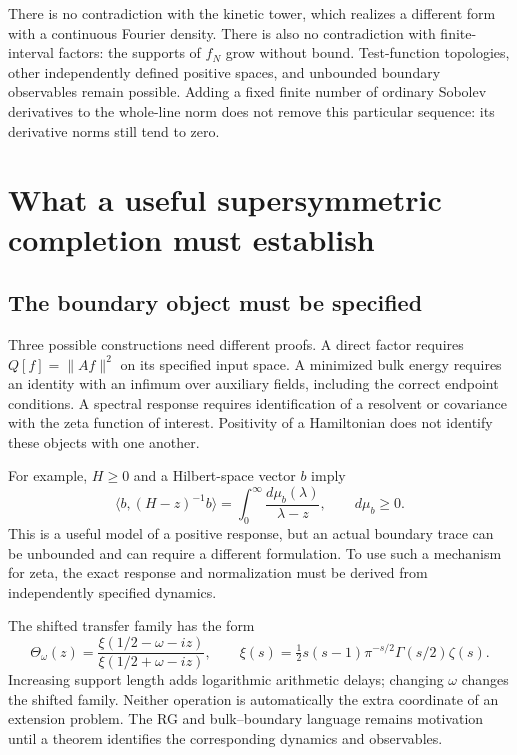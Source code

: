 \documentclass[11pt]{article}
\numberwithin{equation}{section}
\theoremstyle{definition}
\theoremstyle{remark}
\newcommand{\norm}[1]{\lVert#1\rVert}
\newcommand{\ip}[2]{\langle#1,#2\rangle}
\begin{document}
There is no contradiction with the kinetic tower, which realizes a
different form with a continuous Fourier density. There is also no
contradiction with finite-interval factors: the supports of $f_N$ grow
without bound. Test-function topologies, other independently defined
positive spaces, and unbounded boundary observables remain possible.
Adding a fixed finite number of ordinary Sobolev derivatives to the
whole-line norm does not remove this particular sequence: its derivative
norms still tend to zero.

\section{What a useful supersymmetric completion must establish}
\label{sec:program}

\subsection{The boundary object must be specified}

Three possible constructions need different proofs. A direct factor
requires $Q[f]=\norm{Af}^2$ on its specified input space. A minimized
bulk energy requires an identity with an infimum over auxiliary fields,
including the correct endpoint conditions. A spectral response requires
identification of a resolvent or covariance with the zeta function of
interest. Positivity of a Hamiltonian does not identify these objects
with one another.

For example, $H\geq0$ and a Hilbert-space vector $b$ imply
\[
\ip b{(H-z)^{-1}b}=\int_0^\infty\frac{d\mu_b(\lambda)}{\lambda-z},
\qquad d\mu_b\geq0.
\]
This is a useful model of a positive response, but an actual boundary
trace can be unbounded and can require a different formulation. To use
such a mechanism for zeta, the exact response and normalization must be
derived from independently specified dynamics.

The shifted transfer family has the form
\begin{equation}
\Theta_\omega(z)=
\frac{\xi(1/2-\omega-iz)}{\xi(1/2+\omega-iz)},
\qquad
\xi(s)=\tfrac12s(s-1)\pi^{-s/2}\Gamma(s/2)\zeta(s).
\end{equation}
Increasing support length adds logarithmic arithmetic delays; changing
$\omega$ changes the shifted family. Neither operation is automatically
the extra coordinate of an extension problem. The RG and bulk--boundary
language remains motivation until a theorem identifies the corresponding
dynamics and observables.
\end{document}
